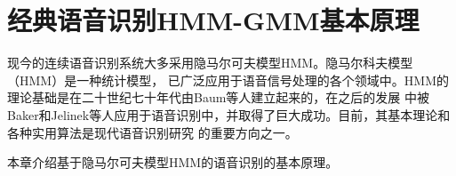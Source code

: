 ﻿%

\chapter{经典语音识别HMM-GMM基本原理}\label{intro_hmm}

现今的连续语音识别系统大多采用隐马尔可夫模型HMM。隐马尔科夫模型（HMM）是一种统计模型，
已广泛应用于语音信号处理的各个领域中。HMM的理论基础是在二十世纪七十年代由Baum等人建立起来的，在之后的发展
中被Baker和Jelinek等人应用于语音识别中，并取得了巨大成功。目前，其基本理论和各种实用算法是现代语音识别研究
的重要方向之一。

本章介绍基于隐马尔可夫模型HMM的语音识别的基本原理。

\newtheorem{definition}{\hspace{2em}\textbf{定义}}[section]
%
%
%
%
%
%
